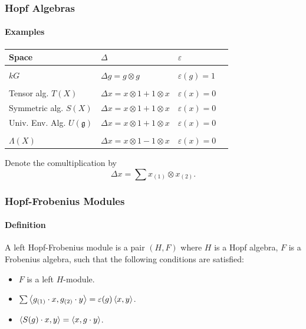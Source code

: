 \documentclass{beamer}
\begin{document}
\begin{frame}


\frametitle{Hopf Algebras}
%

\framesubtitle{Examples}

\begin{tabularx}{\textwidth}{lll>{\raggedright\arraybackslash}X}
\toprule
Space & $\Delta$ & $\varepsilon$
\\
\midrule
\\
$kG$  & $\Delta g = g \otimes g$ & $\varepsilon(g) = 1$ \\
\\
Tensor alg. $T(X)$ & $\Delta x = x \otimes 1 + 1 \otimes x$ & $\varepsilon(x) = 0$ \\
Symmetric alg. $S(X)$ & $\Delta x = x \otimes 1 + 1 \otimes x$ & $\varepsilon(x) = 0$ \\
Univ. Env. Alg. $U(\mathfrak{g})$ & $\Delta x = x \otimes 1 + 1 \otimes x$ & $\varepsilon(x) = 0$
\\
\\
$\Lambda(X)$ & $\Delta x = x \otimes 1 - 1 \otimes x$ & $\varepsilon(x) = 0$
\\
\bottomrule
\end{tabularx}

\medskip 

 Denote the comultiplication by
\begin{equation*}
\Delta x = \sum x_{(1)} \otimes x_{(2)}.
\end{equation*}

\end{frame}



\begin{frame}

\frametitle{Hopf-Frobenius Modules}
\framesubtitle{Definition}

A left Hopf-Frobenius module is a pair $(H,F)$ where $H$ is a Hopf algebra, $F$ is a Frobenius algebra, such that the following conditions are satisfied:

\bigskip

\begin{itemize}

\item {} $F$ is a left $H$-module.

\medskip

\item {}  $\sum \left\langle g_{(1)} \cdot x, g_{(2)} \cdot y \right\rangle = \varepsilon(g) \left\langle x,y \right\rangle$.

\medskip

\item {}  $\left\langle S(g) \cdot x, y \right\rangle = \left\langle x, g \cdot y \right\rangle$.

\end{itemize}





\end{frame}
\end{document}
